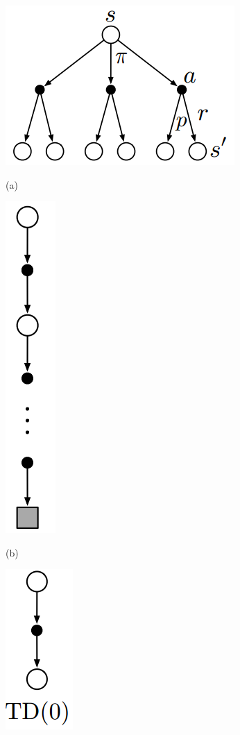 \documentclass[11pt]{article}
\begin{document}
\begin{figure}
\begin{minipage}[t]{0.3\linewidth}
  \centering
  \centerline{\includegraphics[scale = 0.3]{backup_diagram_dp.png}}
  \vspace{-7pt}
 \centerline{\footnotesize{(a) }}
\end{minipage}
\begin{minipage}[t]{0.3\linewidth}
  \centering
  \centerline{\includegraphics[scale = 0.3]{backup_diagram_mc.png}}
  \vspace{-7pt}
 \centerline{\footnotesize{(b) }}
\end{minipage}
\begin{minipage}[t]{0.3\linewidth}
  \centering
  \centerline{\includegraphics[scale = 0.3]{backup_diagram_td.png}}

\end{minipage}
\end{figure}
\end{document}
